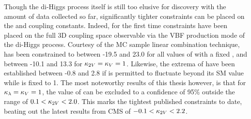 Though the di-Higgs process itself is still too elusive for discovery with the amount of data collected so far,
    significantly tighter constraints can be placed on the \kvv and \kl coupling constants.
Indeed, for the first time constraints have been placed on the full
    3D coupling space observable via the VBF production mode of the di-Higgs process.
Courtesy of the MC sample linear combination technique,
    \kl has been constrained to between -19.5 and 23.0 for all values of \kvv with a fixed ,
    and between -10.1 and 13.3 for $\kappa_{2V}=\kappa_{V}=1$.
Likewise, the extrema of \kvv have been established between -0.8 and 2.8
    if \kl is permitted to fluctuate beyond its SM value while \kv is fixed to 1.
The most noteworthy results of this thesis however, is that for $\kappa_{\lambda}=\kappa_{V}=1$,
    the value of \kvv can be excluded to a confidence of 95\% outside the range of $0.1 < \kappa_{2V} < 2.0$.
This marks the tightest published constraints to date, beating out the latest results from CMS
    of $-0.1 < \kappa_{2V} < 2.2$\cite{cms_results}.

